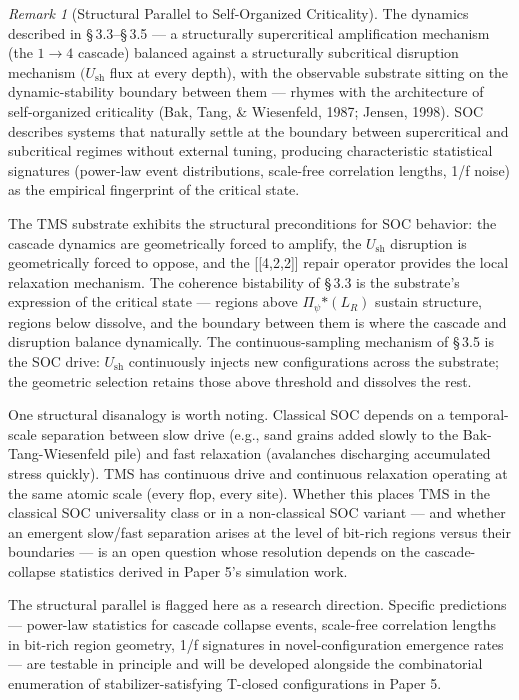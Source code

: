 \documentclass[11pt,oneside]{report}
\theoremstyle{definition}
\theoremstyle{remark}
\newtheorem{remark}[theorem]{Remark}
\begin{document}
\begin{remark}[Structural Parallel to Self-Organized Criticality]
The
dynamics described in \S\,3.3--\S\,3.5 --- a structurally supercritical
amplification mechanism (the \ensuremath{1\to 4} cascade) balanced against a
structurally subcritical disruption mechanism \ensuremath{(U_{\mathrm{sh}}} flux at every depth),
with the observable substrate sitting on the dynamic-stability boundary
between them --- rhymes with the architecture of self-organized
criticality (Bak, Tang, \& Wiesenfeld, 1987; Jensen, 1998). SOC
describes systems that naturally settle at the boundary between
supercritical and subcritical regimes without external tuning, producing
characteristic statistical signatures (power-law event distributions,
scale-free correlation lengths, 1/f noise) as the empirical fingerprint
of the critical state.
\end{remark}

The TMS substrate exhibits the structural preconditions for SOC
behavior: the cascade dynamics are geometrically forced to amplify, the
\ensuremath{U_{\mathrm{sh}}} disruption is geometrically forced to oppose, and the
[[4,2,2]] repair operator provides the local relaxation
mechanism. The coherence bistability of \S\,3.3 is the substrate's
expression of the critical state --- regions above
\textbar \ensuremath{\Pi_{\psi}}\textbar\ensuremath{*(L_{R})} sustain structure, regions below dissolve,
and the boundary between them is where the cascade and disruption
balance dynamically. The continuous-sampling mechanism of \S\,3.5 is the
SOC drive: \ensuremath{U_{\mathrm{sh}}} continuously injects new configurations across the
substrate; the geometric selection retains those above threshold and
dissolves the rest.

One structural disanalogy is worth noting. Classical SOC depends on a
temporal-scale separation between slow drive (e.g., sand grains added
slowly to the Bak-Tang-Wiesenfeld pile) and fast relaxation (avalanches
discharging accumulated stress quickly). TMS has continuous drive and
continuous relaxation operating at the same atomic scale (every flop,
every site). Whether this places TMS in the classical SOC universality
class or in a non-classical SOC variant --- and whether an emergent
slow/fast separation arises at the level of bit-rich regions versus
their boundaries --- is an open question whose resolution depends on the
cascade-collapse statistics derived in Paper 5's simulation work.

The structural parallel is flagged here as a research direction.
Specific predictions --- power-law statistics for cascade collapse
events, scale-free correlation lengths in bit-rich region geometry, 1/f
signatures in novel-configuration emergence rates --- are testable in
principle and will be developed alongside the combinatorial enumeration
of stabilizer-satisfying T-closed configurations in Paper 5.
\end{document}
